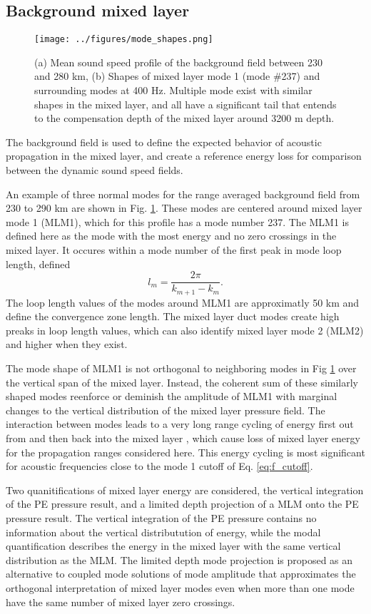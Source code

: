 \documentclass[preprint,NumberedRefs]{JASA}
\begin{document}
\subsection{Background mixed layer}\label{ssec:bg}
\begin{figure}
\texttt{[image: ../figures/mode\_shapes.png]}
    \caption{\label{fig:bg_modes}{(a) Mean sound speed profile of the background field between 230 and 280 km, (b) Shapes of mixed layer mode 1 (mode \#237) and surrounding modes at 400 Hz. Multiple mode exist with similar shapes in the mixed layer, and all have a significant tail that entends to the compensation depth of the mixed layer around 3200 m depth.}}
\end{figure}
The background field is used to define the expected behavior of acoustic propagation in the mixed layer, and create a reference energy loss for comparison between the dynamic sound speed fields.

An example of three normal modes for the range averaged background field from 230 to 290 km are shown in Fig. \ref{fig:bg_modes}. These modes are centered around mixed layer mode 1 (MLM1), which for this profile has a mode number 237. The MLM1 is defined here as the mode with the most energy and no zero crossings in the mixed layer. It occures within a mode number of the first peak in mode loop length\citep{jensen2011computational}, defined
\begin{equation}
    l_{m} = \frac{2 \pi}{k_{m+1} - k_m}.
    \label{eq:loop_length}
\end{equation}
The loop length values of the modes around MLM1 are approximatly 50 km and define the convergence zone length. The mixed layer duct modes create high preaks in loop length values, which can also identify mixed layer mode 2 (MLM2) and higher when they exist.

The mode shape of MLM1 is not orthogonal to neighboring modes in Fig \ref{fig:bg_modes} over the vertical span of the mixed layer. Instead, the coherent sum of these similarly shaped modes reenforce or deminish the amplitude of MLM1 with marginal changes to the vertical distribution of the mixed layer pressure field. The interaction between modes leads to a very long range cycling of energy first out from and then back into the mixed layer \citep{porter93}, which cause loss of mixed layer energy for the propagation ranges considered here. This energy cycling is most significant for acoustic frequencies close to the mode 1 cutoff of Eq. \eqref{eq:f_cutoff}.

Two quanitifications of mixed layer energy are considered, the vertical integration of the PE pressure result, and a limited depth projection of a MLM onto the PE pressure result. The vertical integration of the PE pressure contains no information about the vertical distributution of energy, while the modal quantification describes the energy in the mixed layer with the same vertical distribution as the MLM. The limited depth mode projection is proposed as an alternative to coupled mode solutions of mode amplitude that approximates the orthogonal interpretation of mixed layer modes even when more than one mode have the same number of mixed layer zero crossings.
\end{document}
